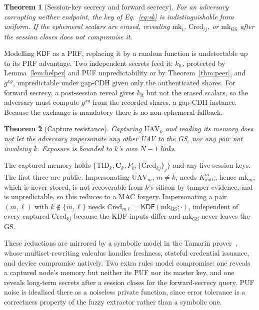 \documentclass[conference]{IEEEtran}
\newtheorem{theorem}{Theorem}
\begin{document}
\begin{theorem}[Session-key secrecy and forward secrecy]
\label{thm:pfs}
For an adversary corrupting neither endpoint, the key of Eq.~\eqref{eq:sk} is
indistinguishable from uniform. If the ephemeral scalars are erased, revealing
$\text{mk}_i$, $\text{Cred}_{ij}$, or $\text{mk}_{\text{GS}}$ after the session
closes does not compromise it.
\end{theorem}

\begin{IEEEproof}
Modelling $\mathsf{KDF}$ as a PRF, replacing it by a random function is
undetectable up to its PRF advantage. Two independent secrets feed it:
$k_{\text{lt}}$, protected by Lemma~\ref{lem:helper} and PUF unpredictability
or by Theorem~\ref{thm:peer}, and $g^{xy}$, unpredictable under gap-CDH given
only the authenticated shares. For forward secrecy, a post-session reveal gives
$k_{\text{lt}}$ but not the erased scalars, so the adversary must compute
$g^{xy}$ from the recorded shares, a gap-CDH instance. Because the exchange is
mandatory there is no non-ephemeral fallback.
\end{IEEEproof}

\begin{theorem}[Capture resistance]
\label{thm:capture}
Capturing $\text{UAV}_k$ and reading its memory does not let the adversary
impersonate any other UAV to the GS, nor any pair not involving $k$. Exposure is
bounded to $k$'s own $N-1$ links.
\end{theorem}

\begin{IEEEproof}
The captured memory holds $\{\text{TID}_k, \bm{C}_k, P_k, \{\text{Cred}_{kj}\}_j\}$
and any live session keys. The first three are public. Impersonating
$\text{UAV}_m$, $m \ne k$, needs $K^{m}_{\text{auth}}$, hence $\text{mk}_m$,
which is never stored, is not recoverable from $k$'s silicon by tamper
evidence, and is unpredictable, so this reduces to a MAC forgery. Impersonating
a pair $(m,\ell)$ with $k \notin \{m,\ell\}$ needs
$\text{Cred}_{m\ell} = \mathsf{KDF}(\text{mk}_{\text{GS}}; \cdot)$, independent
of every captured $\text{Cred}_{kj}$ because the KDF inputs differ and
$\text{mk}_{\text{GS}}$ never leaves the GS.
\end{IEEEproof}

These reductions are mirrored by a symbolic model in the Tamarin
prover~\cite{tamarin}, whose multiset-rewriting calculus handles freshness,
stateful credential issuance, and device compromise natively. Two extra rules
model compromise: one reveals a captured node's memory but neither its PUF nor
its master key, and one reveals long-term secrets after a session closes for the
forward-secrecy query. PUF noise is idealised there as a noiseless private
function, since error tolerance is a correctness property of the fuzzy
extractor rather than a symbolic one.
\end{document}
